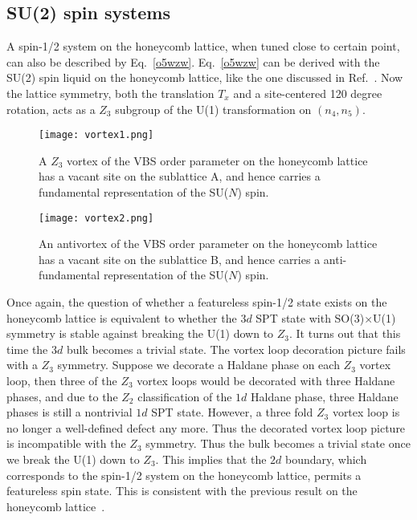 \documentclass[aps,prb,twocolumn,superscriptaddress,showpacs]{revtex4}
\begin{document}
\subsection{SU(2) spin systems}


A spin-1/2 system on the honeycomb lattice, when tuned close to
certain point, can also be described by Eq.~\ref{o5wzw}.
Eq.~\ref{o5wzw} can be derived with the SU(2) spin liquid on the
honeycomb lattice, like the one discussed in
Ref.~. Now the lattice symmetry, both the
translation $T_x$ and a site-centered 120 degree rotation, acts as
a $Z_3$ subgroup of the U(1) transformation on $(n_4, n_5)$.

\begin{figure}[tbp]
\begin{center}
\texttt{[image: vortex1.png]}
\caption{A $Z_3$ vortex of the VBS order parameter on the
honeycomb lattice has a vacant site on the sublattice A, and hence
carries a fundamental representation of the SU($N$) spin.}
\label{v1}
\end{center}
\end{figure}

\begin{figure}[tbp]
\begin{center}
\texttt{[image: vortex2.png]}
\caption{An antivortex of the VBS order parameter on the honeycomb
lattice has a vacant site on the sublattice B, and hence carries a
anti-fundamental representation of the SU($N$) spin.} \label{v2}
\end{center}
\end{figure}


Once again, the question of whether a featureless spin-1/2 state
exists on the honeycomb lattice is equivalent to whether the $3d$
SPT state with SO(3)$\times$U(1) symmetry is stable against
breaking the U(1) down to $Z_3$. It turns out that this time the
$3d$ bulk becomes a trivial state. The vortex loop decoration
picture fails with a $Z_3$ symmetry. Suppose we decorate a Haldane
phase on each $Z_3$ vortex loop, then three of the $Z_3$ vortex
loops would be decorated with three Haldane phases, and due to the
$Z_2$ classification of the $1d$ Haldane phase, three Haldane
phases is still a nontrivial $1d$ SPT state. However, a three fold
$Z_3$ vortex loop is no longer a well-defined defect any more.
Thus the decorated vortex loop picture is incompatible with the
$Z_3$ symmetry. Thus the bulk becomes a trivial state once we
break the U(1) down to $Z_3$. This implies that the $2d$ boundary,
which corresponds to the spin-1/2 system on the honeycomb lattice,
permits a featureless spin state. This is consistent with the
previous result on the honeycomb lattice~\cite{jian1,jian2}.
\end{document}
